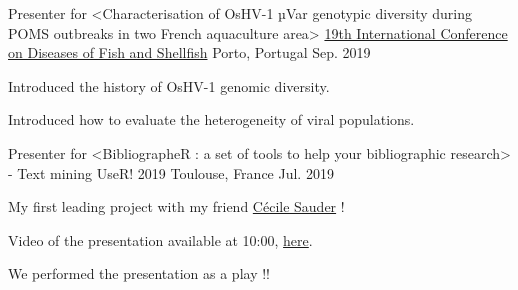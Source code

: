 

\begin{cventries}

  \cventry
    {Presenter for <Characterisation of OsHV-1 µVar genotypic diversity during POMS outbreaks in two French aquaculture area>} %
    {\href{https://eafp.org/19-eafp-porto-2019/}{19th International Conference on Diseases of Fish and Shellfish}} %
    {Porto, Portugal} %
    {Sep. 2019} %
    {
      \begin{cvitems} %
        \item {Introduced the history of OsHV-1 genomic diversity.}
        \item {Introduced how to evaluate the heterogeneity of viral populations.}
      \end{cvitems}
    }

  \cventry
    {Presenter for <BibliographeR : a set of tools to help your bibliographic research>  - Text mining} %
    {UseR! 2019} %
    {Toulouse, France} %
    {Jul. 2019} %
    {
      \begin{cvitems} %
        \item {My first leading project with my friend \href{https://twitter.com/cecilesauder}{Cécile Sauder} !}
        \item {Video of the presentation available at 10:00, \href{https://www.youtube.com/watch?v=6V_nu0K_3mk&list=PL4IzsxWztPdm9_UFnWOCG7Rmw3oW5Fgju}{here}.}
        \item {We performed the presentation as a play !!}
        \\
      \end{cvitems}
    }

\end{cventries}
